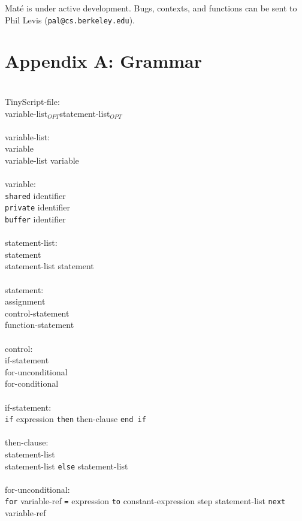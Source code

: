 \documentclass[12pt]{article}
\newcommand{\mate}{Mat\'{e}\xspace}
\newcommand{\kw}[1]{{\tt #1}}
\newcommand{\grammarindent}{\hspace*{2cm}\= \\ \kill}
\newcommand{\opt}{$_{OPT}$}
\begin{document}
\mate is under active development. Bugs, contexts, and functions can be sent
to Phil Levis ({\tt pal@cs.berkeley.edu}).

\section{Appendix A: Grammar}
\em \begin{tabbing}
\grammarindent
TinyScript-file: \\
\>  variable-list\opt statement-list\opt\\
\\
variable-list:\\
\> variable \\
\> variable-list variable\\
\\
variable:\\
\> \kw{shared} identifier\\
\> \kw{private} identifier\\
\> \kw{buffer} identifier\\
\\
statement-list:\\
\> statement\\
\> statement-list statement\\
\\
statement:\\
\> assignment\\
\> control-statement\\
\> function-statement \\
\\
control:\\
\> if-statement\\
\> for-unconditional\\
\> for-conditional\\
\\
if-statement:\\
\> \kw{if} expression \kw{then} then-clause \kw{end if}\\
\\
then-clause:\\
\> statement-list\\
\> statement-list \kw{else} statement-list \\
\\
for-unconditional:\\
\> \kw{for} variable-ref \kw{=} expression \kw{to} constant-expression step statement-list \kw{next} variable-ref\\
\\

\end{tabbing}
\end{document}
